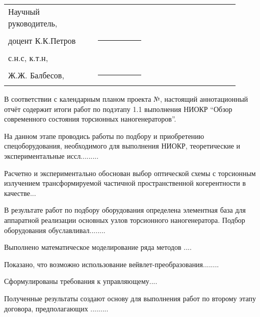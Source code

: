 \documentclass[utf8,usehyperref,12pt]{G7-32}
\newcommand{\No}{№}
\begin{document}

\frontmatter %



\Executors %
\begin{longtable}{p{0.35\linewidth}p{0.2\linewidth}p{0.35\linewidth}}
Научный руководитель, 	&		&	\\
доцент К.К.Петров	&\rule{1\linewidth}{0.1pt}	&  \\ \vspace{1cm}

с.н.с, к.т.н,  &		&	\\
Ж.Ж. Балбесов, & \rule{1\linewidth}{0.1pt}& \\
\end{longtable}

\Referat %
В соответствии с календарным планом проекта \No, настоящий аннотационный отчёт содержит итоги работ по подэтапу 1.1 выполнения НИОКР ``Обзор современного состояния торсионных наногенераторов''.

На данном этапе проводись работы по подбору и приобретению спецоборудования, необходимого для выполнения НИОКР, теоретические и экспериментальные иссл.........

Расчетно и экспериментально обоснован выбор оптической схемы с торсионным излучением трансформируемой частичной пространственной когерентности в качестве...

В результате работ по подбору оборудования определена элементная база для аппаратной реализации основных узлов торсионного наногенератора. Подбор оборудования обуславливал........

Выполнено математическое моделирование ряда методов .... 

Показано, что возможно использование вейвлет-преобразования........

Сформулированы требования к управляющему....

Полученные результаты создают основу для выполнения работ по второму этапу договора, предполагающих .........

\tableofcontents
\end{document}
